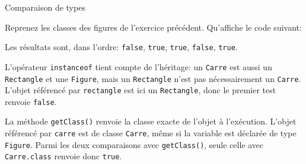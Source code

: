 \begin{Exercice}[5 minutes]{Comparaison de types}
	
Reprenez les classes des figures de l'exercice précédent. Qu'affiche le code suivant:


\begin{solution}
Les résultats sont, dans l'ordre: \lstinline{false}, \lstinline{true}, \lstinline{true}, \lstinline{false}, \lstinline{true}.

L'opérateur \lstinline{instanceof} tient compte de l'héritage: un \lstinline{Carre} est aussi un \lstinline{Rectangle} et une \lstinline{Figure}, mais un \lstinline{Rectangle} n'est pas nécessairement un \lstinline{Carre}. L'objet référencé par \lstinline{rectangle} est ici un \lstinline{Rectangle}, donc le premier test renvoie \lstinline{false}.

La méthode \lstinline{getClass()} renvoie la classe exacte de l'objet à l'exécution. L'objet référencé par \lstinline{carre} est de classe \lstinline{Carre}, même si la variable est déclarée de type \lstinline{Figure}. Parmi les deux comparaisons avec \lstinline{getClass()}, seule celle avec \lstinline{Carre.class} renvoie donc \lstinline{true}.
\end{solution}
\end{Exercice}

